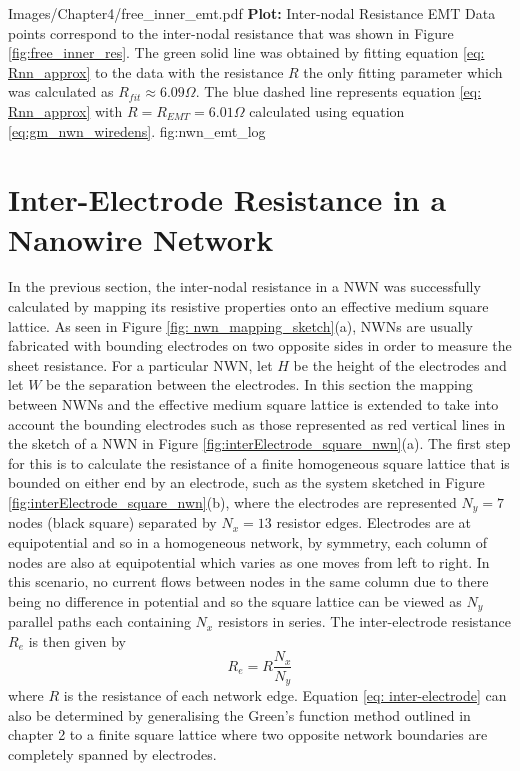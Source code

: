{Images/Chapter4/free_inner_emt.pdf}
{\textbf{Plot:} Inter-nodal Resistance EMT }
{Data points correspond to the inter-nodal resistance that was shown in Figure \ref{fig:free_inner_res}. The green solid line was obtained by fitting equation \ref{eq: Rnn_approx} to the data with the resistance $R$ the only fitting parameter which was calculated as $R_{fit} \approx 6.09 \Omega$. The blue dashed line represents equation \ref{eq: Rnn_approx} with $R = R_{EMT} = 6.01 \Omega$ calculated using equation \ref{eq:gm_nwn_wiredens}. }
{fig:nwn_emt_log}

\section{Inter-Electrode Resistance in a Nanowire Network}
\label{Sec: Inter Electrode}
In the previous section, the inter-nodal resistance in a NWN was successfully calculated by mapping its resistive properties onto an effective medium square lattice. As seen in Figure \ref{fig: nwn_mapping_sketch}(a), NWNs are usually fabricated with bounding electrodes on two opposite sides in order to measure the sheet resistance. For a particular NWN, let $H$ be the height of the electrodes and let $W$ be the separation between the electrodes. In this section the mapping between NWNs and the effective medium square lattice is extended to take into account the bounding electrodes such as those represented as red vertical lines in the sketch of a NWN in Figure \ref{fig:interElectrode_square_nwn}(a). The first step for this is to calculate the resistance of a finite homogeneous square lattice that is bounded on either end by an electrode, such as the system sketched in Figure \ref{fig:interElectrode_square_nwn}(b), where the electrodes are represented $N_y=7$ nodes (black square)  separated by $N_x = 13$ resistor edges. Electrodes are at equipotential and so in a homogeneous network, by symmetry, each column of nodes are also at equipotential which varies as one moves from left to right. In this scenario, no current flows between nodes in the same column due to there being no difference in potential and so the square lattice can be viewed as $N_y$ parallel paths each containing $N_x$ resistors in series. The inter-electrode resistance $R_e$ is then given by
\begin{equation}
R_e = R \frac{N_x}{N_y}
\label{eq: inter-electrode}
\end{equation}
where $R$ is the resistance of each network edge. Equation \ref{eq: inter-electrode} can also be determined by generalising the Green's function method outlined in chapter 2 to a finite square lattice where two opposite network boundaries are completely spanned by electrodes.


